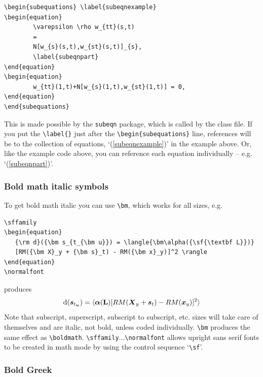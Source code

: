 \documentclass{nCSE2e}
\begin{document}
\begin{verbatim}
\begin{subequations} \label{subeqnexample}
\begin{equation}
        \varepsilon \rho w_{tt}(s,t)
        =
        N[w_{s}(s,t),w_{st}(s,t)]_{s},
        \label{subeqnpart}
\end{equation}
\begin{equation}
        w_{tt}(1,t)+N[w_{s}(1,t),w_{st}(1,t)] = 0,
\end{equation}
\end{subequations}
\end{verbatim}
This is made possible by the {\tt{subeqn}} package, which is called
by the class file. If you put the \verb"\label{}" just after the
\verb"\begin{subequations}" line, references will be to the
collection of equations, `(\ref{subeqnexample})' in the example
above. Or, like the example code above, you can reference each
equation individually -- e.g. `(\ref{subeqnpart})'.

\subsubsection{Bold math italic symbols}

To get bold math italic you can use \verb"\bm", which works for
all sizes, e.g.
%
\begin{verbatim}
\sffamily
\begin{equation}
   {\rm d}({\bm s_{t_{\bm u}}) = \langle{\bm\alpha({\sf{\textbf L}})}
   [RM({\bm X}_y + {\bm s}_t) - RM({\bm x}_y)]^2 \rangle
\end{equation}
\normalfont
\end{verbatim}
%
produces\sffamily
\begin{equation}
   {\rm d}({\bm s_{t_{\bm u}}}) = \langle {\bm\alpha({\sf{\textbf L}})}[RM({\bm X}_y
   + {\bm s}_t) - RM({\bm x}_y)]^2 \rangle
\end{equation}\normalfont
Note that subscript, superscript, subscript to subscript, etc.
sizes will take care of themselves and are italic, not bold,
unless coded individually. \verb"\bm" produces the same effect as
\verb"\boldmath". \verb"\sffamily"...\verb"\normalfont" allows
upright sans serif fonts to be created in math mode by using the
control sequence `\verb"\sf"'.

\subsubsection{Bold Greek}\label{boldgreek}
\end{document}
